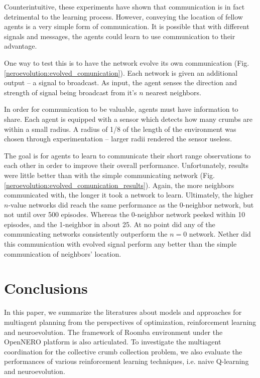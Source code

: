 \documentclass[conference]{IEEEtran}
\begin{document}
Counterintuitive, these experiments have shown that communication is in fact detrimental to the learning process.
However, conveying the location of fellow agents is a very simple form of communication. It is possible that with different signals and messages, the agents could learn to use communication to their advantage.

One way to test this is to have the network evolve its own communication (Fig. \ref{neroevolution:evolved_comunication}). Each network is given an additional output -- a signal to broadcast. As input, the agent senses the direction and strength of signal being broadcast from it's $n$ nearest neighbors. 

In order for communication to be valuable, agents must have information to share. 
Each agent is equipped with a sensor which detects how many crumbs are within a small radius. A radius of 1/8 of the length of the environment was chosen through experimentation -- larger radii rendered the sensor useless.



The goal is for agents to learn to communicate their short range observations to each other in order to improve their overall performance.
Unfortunately, results were little better than with the simple communicating network (Fig. \ref{neroevolution:evolved_comunication_results}). 
Again, the more neighbors communicated with, the longer it took a network to learn. Ultimately, the higher $n$-value networks did reach the same performance as the 0-neighbor network, but not until over 500 episodes. Whereas the 0-neighbor network peeked within 10 episodes, and the 1-neighbor in about 25. At no point did any of the communicating networks consistently outperform the $n=0$ network. Nether did this communication with evolved signal perform any better than the simple communication of neighbors' location. 





\section{Conclusions} \label{conclusion}
In this paper, we summarize the literatures about models and approaches for 
multiagent planning from the perspectives of optimization, reinforcement
learning and neuroevolution. The framework of Roomba environment under the
OpenNERO platform is also articulated. 
To investigate the multiagent coordination for the collective crumb collection
problem, we also evaluate the performances of various reinforcement learning
techniques, i.e. naive Q-learning and neuroevolution. 
\end{document}
